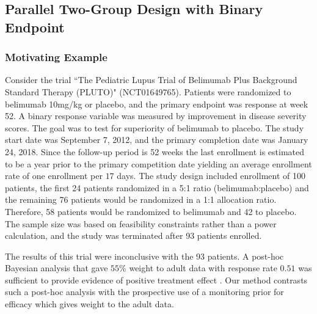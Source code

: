 \documentclass[useAMS,usenatbib,referee]{biom}
\begin{document}

\subsection{Parallel Two-Group Design with Binary Endpoint}\label{sec:example2}
\subsubsection{Motivating Example}
Consider the trial ``The Pediatric Lupus Trial of Belimumab Plus Background Standard Therapy (PLUTO)" (NCT01649765).
%
Patients were randomized to belimumab 10mg/kg or placebo, and the primary endpoint was response at week 52.
%
A binary response variable was measured by improvement in disease severity scores.
%
The goal was to test for superiority of belimumab to placebo. 
%
The study start date was September 7, 2012, and the primary completion date was January 24, 2018.
%
Since the follow-up period is 52 weeks the last enrollment is estimated to be a year prior to the primary competition date yielding an average enrollment rate of one enrollment per $17$ days.
%
The study design included enrollment of 100 patients, the first 24 patients randomized in a 5:1 ratio (belimumab:placebo) and the remaining 76 patients would be randomized in a 1:1 allocation ratio.
%
Therefore, 58 patients would be randomized to belimumab and 42 to placebo.
%
The sample size was based on feasibility constraints rather than a power calculation, and the study was terminated after 93 patients enrolled.

The results of this trial were inconclusive with the 93 patients.
%
A post-hoc Bayesian analysis that gave $55\%$ weight to adult data with response rate $0.51$ was sufficient to provide evidence of positive treatment effect \citep{Travis2019}.
%
Our method contrasts such a post-hoc analysis with the prospective use of a monitoring prior for efficacy which gives weight to the adult data.
\end{document}
